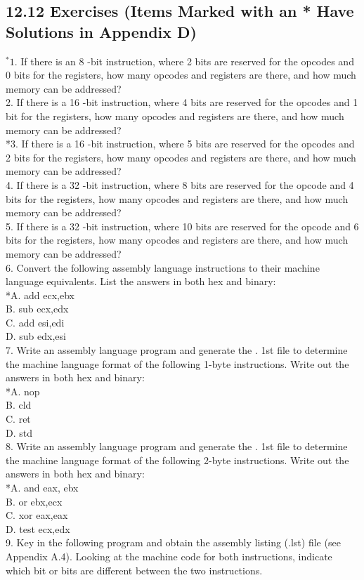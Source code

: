 \documentclass[10pt]{book}
\begin{document}
\begin{center}
\begin{center}
\begin{center}
\begin{center}
\begin{center}
\subsection*{12.12 Exercises (Items Marked with an * Have Solutions in Appendix D)}
${ }^{*} 1$. If there is an 8 -bit instruction, where 2 bits are reserved for the opcodes and 0 bits for the registers, how many opcodes and registers are there, and how much memory can be addressed?\\
2. If there is a 16 -bit instruction, where 4 bits are reserved for the opcodes and 1 bit for the registers, how many opcodes and registers are there, and how much memory can be addressed?\\
*3. If there is a 16 -bit instruction, where 5 bits are reserved for the opcodes and 2 bits for the registers, how many opcodes and registers are there, and how much memory can be addressed?\\
4. If there is a 32 -bit instruction, where 8 bits are reserved for the opcode and 4 bits for the registers, how many opcodes and registers are there, and how much memory can be addressed?\\
5. If there is a 32 -bit instruction, where 10 bits are reserved for the opcode and 6 bits for the registers, how many opcodes and registers are there, and how much memory can be addressed?\\
6. Convert the following assembly language instructions to their machine language equivalents. List the answers in both hex and binary:\\
*A. add ecx,ebx\\
B. sub ecx,edx\\
C. add esi,edi\\
D. sub edx,esi\\
7. Write an assembly language program and generate the . 1st file to determine the machine language format of the following 1-byte instructions. Write out the answers in both hex and binary:\\
*A. nop\\
B. cld\\
C. ret\\
D. std\\
8. Write an assembly language program and generate the . 1st file to determine the machine language format of the following 2-byte instructions. Write out the answers in both hex and binary:\\
*A. and eax, ebx\\
B. or ebx,ecx\\
C. xor eax,eax\\
D. test ecx,edx\\
9. Key in the following program and obtain the assembly listing (.lst) file (see Appendix A.4). Looking at the machine code for both instructions, indicate which bit or bits are different between the two instructions.


\end{center}
\end{center}
\end{center}
\end{center}
\end{center}
\end{document}
